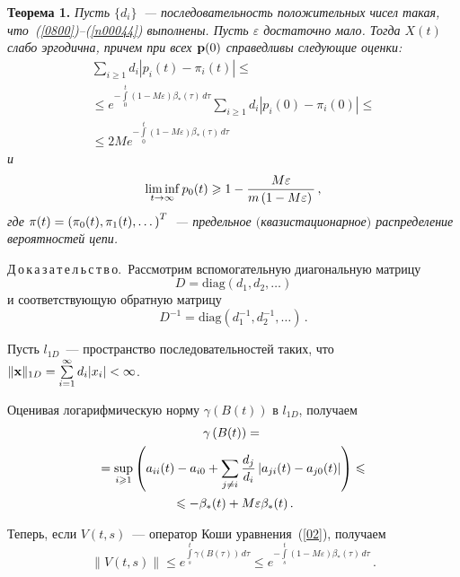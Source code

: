 \begin{multicols}{2}
\medskip

\noindent
{\bf Теорема 1. } {\it Пусть $\{d_i\}$~--- последовательность
положительных чисел такая, что~(\ref{0800})--(\ref{n00044})
выполнены. Пусть $\varepsilon$ достаточно мало.
Тогда $X(t)$ слабо эргодична, причем при всех   ${\bf p}(0)$
справедливы следующие оценки:
\begin{multline}
\sum_{i \ge 1} d_i \left|p_i(t) -
\pi_i(t)\right| \le{}\\
{}\le  e^{-\int\limits_0^t\left(1- M\varepsilon\right)
\beta_* (\tau)\, d\tau} \sum_{i \ge 1} d_i \left|p_i(0) -
\pi_i(0)\right| \le{}\\
{}\le
2M
e^{-\int\limits_0^t\left(1- M\varepsilon\right) \beta_* (\tau)\, d\tau}
\label{n00045}
\end{multline}
и
\begin{equation}
\liminf_{t \to \infty} p_0(t) \geqslant 1 -
 \displaystyle\frac{\displaystyle M\varepsilon\mathstrut}{\displaystyle m\left(1-M\varepsilon\right)\mathstrut}\,,
\label{n00048}
\end{equation}
где  ${\bf\pi}(t) = \left(\pi_0(t), \pi_1(t), \dots \right)^T$~--- предельное
$($квазистационарное$)$ распределение вероятностей цепи.}

\noindent
Д\,о\,к\,а\,з\,а\,т\,е\,л\,ь\,с\,т\,в\,о.~Рассмотрим вспомогательную диагональную матрицу
\begin{equation*}
 D=\mathrm{diag}\left (d_{1},d_{2},\ldots \right )
\end{equation*}
и соответствующую обратную матрицу
\begin{equation*}
 D^{-1}=\mathrm{diag}\left ( d^{-1}_{1},d^{-1}_{2},\ldots \right )\,.
\end{equation*}

Пусть $l_{1D}$~--- пространство последовательностей таких, что
$\|{\bf x}\|_{1D}=\sum\limits_{i=1}^{\infty}d_{i}|x_{i}|<\infty$.

Оценивая логарифмическую норму  $\gamma \left(B(t)\right)$ в
$l_{1D}$, получаем
\begin{multline*}
\gamma \left(B(t)\right) ={}\\
{}= \sup_{i \geqslant 1} \left(a_{ii} (t)- a_{i0} +
\sum_{j \neq i} \displaystyle\frac{\displaystyle d_j\mathstrut}{\displaystyle d_i\mathstrut}\left|a_{ji} (t)- a_{j0} (t)\right|
\right) \leqslant{}\\
{}\leqslant -\beta_* (t) + M\varepsilon \beta_* (t)\,. 
\end{multline*}

Теперь, если  $V(t,s)$~--- оператор Коши уравнения~(\ref{02}),
получаем
\begin{equation*}
\left\|V(t,s)\right\| \le e^{\int\limits_s^t\gamma \left(B(\tau)\right)\,
d\tau} \le  e^{-\int\limits_s^t\left(1- M\varepsilon\right) \beta_*
(\tau)\, d\tau}\,. 
\end{equation*}


\end{multicols}
